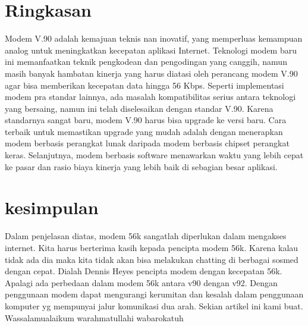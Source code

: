 \section{Ringkasan}

Modem V.90 adalah kemajuan teknis nan inovatif, yang memperluas kemampuan analog untuk meningkatkan kecepatan aplikasi Internet. Teknologi modem baru ini memanfaatkan teknik pengkodean dan pengodingan yang canggih, namun masih banyak hambatan kinerja yang harus diatasi oleh perancang modem V.90 agar bisa memberikan kecepatan data hingga 56 Kbps. Seperti implementasi modem pra standar lainnya, ada masalah kompatibilitas serius antara teknologi yang bersaing, namun ini telah diselesaikan dengan standar V.90. Karena standarnya sangat baru, modem V.90 harus bisa upgrade ke versi baru. Cara terbaik untuk memastikan upgrade yang mudah adalah dengan menerapkan modem berbasis perangkat lunak daripada modem berbasis chipset perangkat keras. Selanjutnya, modem berbasis software menawarkan waktu yang lebih cepat ke pasar dan rasio biaya kinerja yang lebih baik di sebagian besar aplikasi.

\section{kesimpulan}

Dalam penjelasan diatas, modem 56k sangatlah diperlukan dalam mengakses internet. Kita harus berterima kasih kepada pencipta modem 56k. Karena kalau tidak ada dia maka kita tidak akan bisa melakukan chatting di berbagai sosmed dengan cepat. Dialah Dennis Heyes pencipta modem dengan kecepatan 56k. Apalagi ada perbedaan dalam modem 56k antara v90 dengan v92. Dengan penggunaan modem dapat mengurangi kerumitan dan kesalah dalam penggunaan komputer yg mempunyai jalur komunikasi dua arah. Sekian artikel ini kami buat. Wassalamualaikum warahmatullahi wabarokatuh
